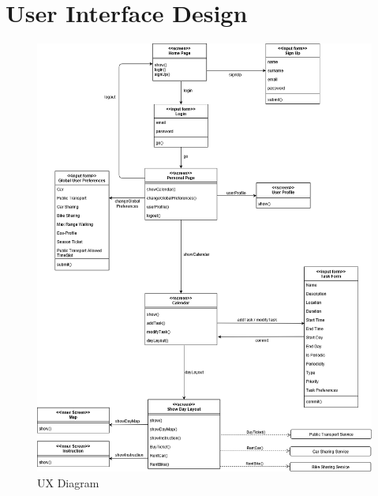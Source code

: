 \chapter{User Interface Design}

\begin{figure}[H]
    \centering
    \includegraphics[scale=0.4]{Pictures/UXDiagram/UXDiagram.png}
    \caption{UX Diagram}
    \label{fig:my_label}
\end{figure}